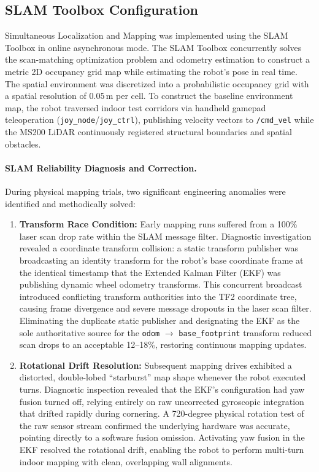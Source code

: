 \subsection{SLAM Toolbox Configuration}
Simultaneous Localization and Mapping was implemented using the SLAM Toolbox in online asynchronous mode. The SLAM Toolbox concurrently solves the scan-matching optimization problem and odometry estimation to construct a metric 2D occupancy grid map while estimating the robot's pose in real time. The spatial environment was discretized into a probabilistic occupancy grid with a spatial resolution of $0.05\,\text{m}$ per cell. To construct the baseline environment map, the robot traversed indoor test corridors via handheld gamepad teleoperation (\texttt{joy\_node}/\texttt{joy\_ctrl}), publishing velocity vectors to \texttt{/cmd\_vel} while the MS200 LiDAR continuously registered structural boundaries and spatial obstacles.

\paragraph{SLAM Reliability Diagnosis and Correction.}
\label{sec:slam_reliability_fixes}
During physical mapping trials, two significant engineering anomalies were identified and methodically solved:
\begin{enumerate}
    \item \textbf{Transform Race Condition:} Early mapping runs suffered from a 100\% laser scan drop rate within the SLAM message filter. Diagnostic investigation revealed a coordinate transform collision: a static transform publisher was broadcasting an identity transform for the robot's base coordinate frame at the identical timestamp that the Extended Kalman Filter (EKF) was publishing dynamic wheel odometry transforms. This concurrent broadcast introduced conflicting transform authorities into the TF2 coordinate tree, causing frame divergence and severe message dropouts in the laser scan filter. Eliminating the duplicate static publisher and designating the EKF as the sole authoritative source for the \texttt{odom} $\to$ \texttt{base\_footprint} transform reduced scan drops to an acceptable 12--18\%, restoring continuous mapping updates.
    \item \textbf{Rotational Drift Resolution:} Subsequent mapping drives exhibited a distorted, double-lobed ``starburst'' map shape whenever the robot executed turns. Diagnostic inspection revealed that the EKF's configuration had yaw fusion turned off, relying entirely on raw uncorrected gyroscopic integration that drifted rapidly during cornering. A 720-degree physical rotation test of the raw sensor stream confirmed the underlying hardware was accurate, pointing directly to a software fusion omission. Activating yaw fusion in the EKF resolved the rotational drift, enabling the robot to perform multi-turn indoor mapping with clean, overlapping wall alignments.
\end{enumerate}

